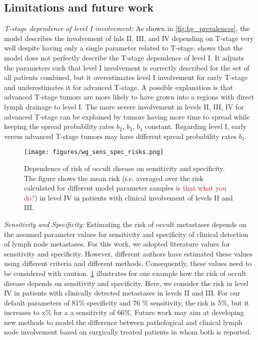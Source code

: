 \documentclass[twocolumn]{aastex631}
\newcommand{\ju}[1]{{\textcolor{red}{#1}}}
\begin{document}
\subsection{Limitations and future work}
\label{subsec:disc:limitation}
{\it T-stage dependence of level I involvement:} As shown in \cref{fig:bg_prevalences}, the model describes the involvement of \glspl{lnl} II, III, and IV depending on T-stage very well despite having only a single parameter related to T-stage.  shows that the model does not perfectly describe the T-stage dependence of level I. It adjusts the parameters such that level I involvement is correctly described for the set of all patients combined, but it overestimates level I involvement for early T-stage and underestimates it for advanced T-stage. A possible explanation is that advanced T-stage tumors are more likely to have grown into a regions with direct lymph drainage to level I. The more severe involvement in levels II, III, IV for advanced T-stage can be explained by tumors having more time to spread while keeping the spread probability rates $b_2$, $b_3$, $b_4$ constant. Regarding level I, early versus advanced T-stage tumors may have different spread probability rates $b_1$.

\begin{figure}
    \begin{centering}
        \texttt{[image: figures/wg\_sens\_spec\_risks.png]}
        \caption{Dependence of risk of occult disease on sensitivity and specificity. The figure shows the mean risk (i.e. averaged over the risk calculated for different model parameter samples \ju{is that what you do?}) in level IV in patients with clinical involvement of levels II and III.}
        \label{fig:wg_sens_spec_risks}
    \end{centering}
\end{figure}

{\it Sensitivity and Specificity:} Estimating the risk of occult metastases depends on the assumed parameter values for sensitivity and specificity of clinical detection of lymph node metastases. For this work, we adopted literature values for sensitivity and specificity. However, different authors have estimated these values using different criteria and different methods. Consequently, these values need to be considered with caution. \cref{fig:wg_sens_spec_risks} illustrates for one example how the risk of occult disease depends on sensitivity and specificity. Here, we consider the risk in level IV in patients with clinically detected metastases in levels II and III. For our default parameters of 81\% specificity and 76 \% sensitivity, the risk is 5\%, but it increases to x\% for a a sensitivity of 66\%. Future work may aim at developing new methods to model the difference between pathological and clinical lymph node involvement based on surgically treated patients in whom both is reported.  



\end{document}
